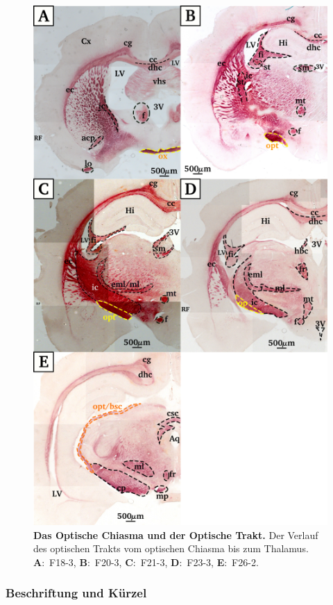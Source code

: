 \documentclass[12pt,a4paper,pdftex]{article}
\begin{document}
\begin{figure}[H]
    \centering
    \includegraphics{pictures/visual/optic_tract.png}
    \caption[Das Optische Chiasma und der Optische Trakt]{\textbf{Das Optische Chiasma und der Optische Trakt.} Der Verlauf des optischen Trakts vom optischen Chiasma bis zum Thalamus. \textbf{A}:~F18-3, \textbf{B}:~F20-3, \textbf{C}:~F21-3, \textbf{D}:~F23-3, \textbf{E}:~F26-2.}
    \label{fig:optic_tract}
\end{figure}

\subsubsection*{Beschriftung und Kürzel}
\end{document}
